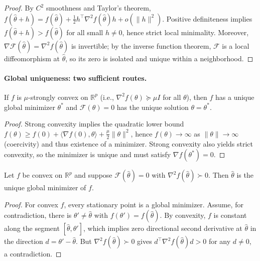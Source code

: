 \documentclass[10pt]{article}
\begin{document}
\begin{proof}
By $C^2$ smoothness and Taylor's theorem,
$f(\hat\theta+h)=f(\hat\theta)+\tfrac12 h^\top \nabla^2 f(\hat\theta) h + o(\|h\|^2)$.
Positive definiteness implies $f(\hat\theta+h)>f(\hat\theta)$ for all small $h\ne0$, hence strict local minimality.
Moreover, $\nabla \mathcal{F}(\hat\theta)=\nabla^2 f(\hat\theta)$ is invertible;
by the inverse function theorem, $\mathcal{F}$ is a local diffeomorphism at $\hat\theta$,
so its zero is isolated and unique within a neighborhood.
\end{proof}

\paragraph{Global uniqueness: two sufficient routes.}
\begin{proposition}
\label{prop:global-strong}
If $f$ is $\mu$-strongly convex on $\mathbb{R}^p$ (i.e., $\nabla^2 f(\theta)\succeq \mu I$ for all $\theta$),
then $f$ has a unique global minimizer $\theta^*$ and $\mathcal{F}(\theta)=0$ has the unique solution $\theta=\theta^*$.
\end{proposition}

\begin{proof}
Strong convexity implies the quadratic lower bound
$f(\theta)\ge f(0)+\langle \nabla f(0),\theta\rangle + \tfrac\mu2\|\theta\|^2$,
hence $f(\theta)\to\infty$ as $\|\theta\|\to\infty$ (coercivity) and thus existence of a minimizer.
Strong convexity also yields strict convexity, so the minimizer is unique and must satisfy $\nabla f(\theta^*)=0$.
\end{proof}

\begin{proposition}
\label{prop:global-convex}
Let $f$ be convex on $\mathbb{R}^p$ and suppose $\mathcal{F}(\hat\theta)=0$ with $\nabla^2 f(\hat\theta)\succ0$.
Then $\hat\theta$ is the unique global minimizer of $f$.
\end{proposition}

\begin{proof}
For convex $f$, every stationary point is a global minimizer.
Assume, for contradiction, there is $\theta'\neq \hat\theta$ with $f(\theta')=f(\hat\theta)$.
By convexity, $f$ is constant along the segment $[\hat\theta,\theta']$,
which implies zero directional second derivative at $\hat\theta$ in the direction $d=\theta'-\hat\theta$.
But $\nabla^2 f(\hat\theta)\succ0$ gives $d^\top \nabla^2 f(\hat\theta) d>0$ for any $d\neq0$, a contradiction.
\end{proof}
\end{document}
